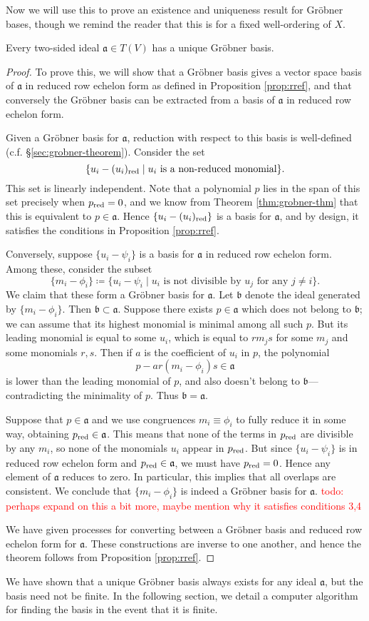 Now we will use this to prove an existence and uniqueness result for Gr\"obner bases, though we remind the reader that this is for a fixed well-ordering of $X$.
\begin{thm}\label{thm:exist+unique}
	Every two-sided ideal $\mathfrak{a}\in T(V)$ has a unique Gr\"obner basis.
\end{thm}
\begin{proof}
	To prove this, we will show that a Gr\"obner basis gives a vector space basis of $\mathfrak{a}$ in reduced row echelon form as defined in Proposition \ref{prop:rref}, and that conversely the Gr\"obner basis can be extracted from a basis of $\mathfrak{a}$ in reduced row echelon form.
	
	Given a Gr\"obner basis for $\mathfrak{a}$, reduction with respect to this basis is well-defined (c.f. \S\ref{sec:grobner-theorem}). Consider the set
	\[
		\{u_i - (u_i)_{\mathrm{red}} \mid u_i \text{ is a non-reduced monomial}\}.
	\]
	This set is linearly independent. Note that a polynomial $p$ lies in the span of this set precisely when $p_{\mathrm{red}} = 0$, and we know from Theorem \ref{thm:grobner-thm} that this is equivalent to $p \in \mathfrak{a}$. Hence $\{u_i - (u_i)_{\mathrm{red}}\}$ is a basis for $\mathfrak{a}$, and by design, it satisfies the conditions in Proposition \ref{prop:rref}.
	
	Conversely, suppose $\{u_i - \psi_i\}$ is a basis for $\mathfrak{a}$ in reduced row echelon form. Among these, consider the subset
	\[
		\{m_i - \phi_i\} \coloneqq \{u_i - \psi_i \mid u_i \text{ is not divisible by } u_j \text{ for any }j\neq i\}.
	\]
	We claim that these form a Gr\"obner basis for $\mathfrak{a}$. Let $\mathfrak{b}$ denote the ideal generated by $\{m_i -\phi_i\}$. Then $\mathfrak{b} \subset \mathfrak{a}$. Suppose there exists $p\in \mathfrak{a}$ which does not belong to $\mathfrak{b}$; we can assume that its highest monomial is minimal among all such $p$. But its leading monomial is equal to some $u_i$, which is equal to $rm_j s$ for some $m_j$ and some monomials $r,s$. Then if $a$ is the coefficient of $u_i$ in $p$, the polynomial
	\[
		p - ar(m_i -\phi_i)s \in \mathfrak{a}
	\]
	is lower than the leading monomial of $p$, and also doesn't belong to $\mathfrak{b}$---contradicting the minimality of $p$. Thus $\mathfrak{b} = \mathfrak{a}$.
	
	Suppose that $p\in \mathfrak{a}$ and we use congruences $m_i \equiv \phi_i$ to fully reduce it in some way, obtaining $p_{\mathrm{red}} \in \mathfrak{a}$. This means that none of the terms in $p_{\mathrm{red}}$ are divisible by any $m_i$, so none of the monomials $u_i$ appear in $p_{\mathrm{red}}$. But since $\{u_i - \psi_i\}$ is in reduced row echelon form and $p_{\mathrm{red}} \in \mathfrak{a}$, we must have $p_{\mathrm{red}} = 0$. Hence any element of $\mathfrak{a}$ reduces to zero. In particular, this implies that all overlaps are consistent. We conclude that $\{m_i - \phi_i\}$ is indeed a Gr\"obner basis for $\mathfrak{a}$. \textcolor{red}{todo: perhaps expand on this a bit more, maybe mention why it satisfies conditions 3,4}
	
	We have given processes for converting between a Gr\"obner basis and reduced row echelon form for $\mathfrak{a}$. These constructions are inverse to one another, and hence the theorem follows from Proposition \ref{prop:rref}.
\end{proof}
We have shown that a unique Gr\"obner basis always exists for any ideal $\mathfrak{a}$, but the basis need not be finite. In the following section, we detail a computer algorithm for finding the basis in the event that it is finite.
